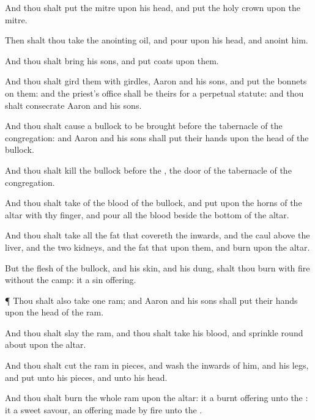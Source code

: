{And thou shalt
put the
mitre upon his
head, and
put the
holy
crown upon the
mitre.

Then shalt thou
take the
anointing
oil, and
pour
{} upon his
head, and
anoint him.

And thou shalt
bring his
sons, and
put
coats upon them.

And thou shalt
gird them with
girdles,
Aaron and his
sons, and
put the
bonnets on them: and the
priest’s office shall be theirs for a
perpetual
statute: and thou shalt
consecrate
Aaron and his
sons.

And thou shalt cause a
bullock to be
brought
before the
tabernacle of the
congregation: and
Aaron and his
sons shall
put their
hands upon the
head of the
bullock.

And thou shalt
kill the
bullock
before the
{},
{} the
door of the
tabernacle of the
congregation.

And thou shalt
take of the
blood of the
bullock, and
put
{} upon the
horns of the
altar with thy
finger, and
pour all the
blood
beside the
bottom of the
altar.

And thou shalt
take all the
fat that
covereth the
inwards, and the
caul
{} above the
liver, and the
two
kidneys, and the
fat that
{} upon them, and
burn
{} upon the
altar.

But the
flesh of the
bullock, and his
skin, and his
dung, shalt thou
burn with
fire
without the
camp: it
{} a sin
offering.


\par }{\PP {}¶ Thou shalt also
take
one
ram; and
Aaron and his
sons shall
put their
hands upon the
head of the
ram.

And thou shalt
slay the
ram, and thou shalt
take his
blood, and
sprinkle
{} round
about upon the
altar.

And thou shalt
cut the
ram in
pieces, and
wash the
inwards of him, and his
legs, and
put
{} unto his
pieces, and unto his
head.

And thou shalt
burn the whole
ram upon the
altar: it
{} a burnt
offering unto the
{}: it
{} a
sweet
savour, an offering made by
fire unto the
{}.


}
